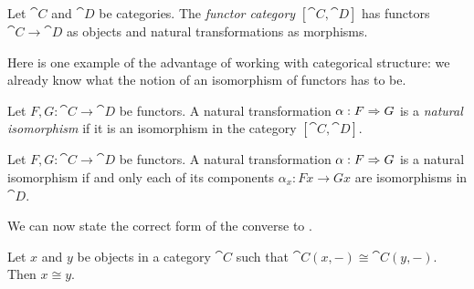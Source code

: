 \begin{dfn}\label{def:functor category}
  Let $\cat{C}$ and $\cat{D}$ be categories. The \emph{functor category}
  $[\cat{C}, \cat{D}]$ has functors $\cat{C}\to\cat{D}$ as objects and natural
  transformations as morphisms.
\end{dfn}

Here is one example of the advantage of working with categorical structure: we
already know what the notion of an isomorphism of functors has to be.

\begin{dfn}\label{def:natural isomorphism}
  Let $F,G:\cat{C}\to\cat{D}$ be functors. A natural transformation $\alpha: F\Rightarrow G$ is a \emph{natural isomorphism} if
  it is an isomorphism in the category $[\cat{C}, \cat{D}]$.
\end{dfn}

\begin{prop}
  Let $F,G:\cat{C}\to\cat{D}$ be functors. A natural transformation $\alpha:
  F\Rightarrow G$ is a natural isomorphism if and only each of its components $\alpha_x:
  Fx\to Gx$ are isomorphisms in $\cat{D}$.
\end{prop}


We can now state the correct form of the converse to .

\begin{thm}\label{thm:hom-iso-implies-iso}
  Let $x$ and $y$ be objects in a category $\cat{C}$ such that $\cat{C}(x,
  -)\cong\cat{C}(y, -)$. Then $x\cong y$.
\end{thm}

